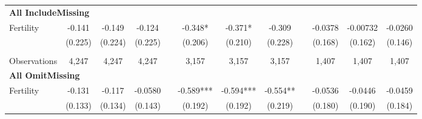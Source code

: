 \begin{landscape}
\begin{table}[htpb!]
\begin{center}
\begin{tabular}{lcccp{2mm}cccp{2mm}ccc}
\multicolumn{12}{l}{\textbf{All IncludeMissing}}\\ 
Fertility&-0.141&-0.149&-0.124&&-0.348*&-0.371*&-0.309&&-0.0378&-0.00732&-0.0260\\
&(0.225)&(0.224)&(0.225)&&(0.206)&(0.210)&(0.228)&&(0.168)&(0.162)&(0.146)\\
\begin{footnotesize}\end{footnotesize}&\begin{footnotesize}\end{footnotesize}&\begin{footnotesize}\end{footnotesize}&\begin{footnotesize}\end{footnotesize}&\begin{footnotesize}\end{footnotesize}&\begin{footnotesize}\end{footnotesize}&\begin{footnotesize}\end{footnotesize}&\begin{footnotesize}\end{footnotesize}&\begin{footnotesize}\end{footnotesize}&\begin{footnotesize}\end{footnotesize}&\begin{footnotesize}\end{footnotesize}&\begin{footnotesize}\end{footnotesize}\\Observations&4,247&4,247&4,247&&3,157&3,157&3,157&&1,407&1,407&1,407\\
\multicolumn{12}{l}{\textbf{All OmitMissing}}\\ 
Fertility&-0.131&-0.117&-0.0580&&-0.589***&-0.594***&-0.554**&&-0.0536&-0.0446&-0.0459\\
&(0.133)&(0.134)&(0.143)&&(0.192)&(0.192)&(0.219)&&(0.180)&(0.190)&(0.184)\\

\end{tabular}
\end{center}
\end{table}
\end{landscape}
